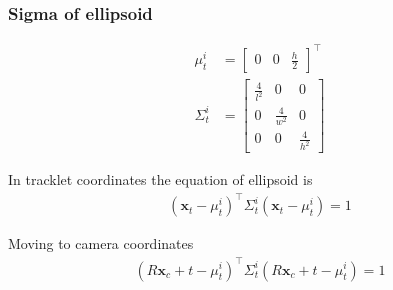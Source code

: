 \documentclass[10pt,twocolumn,letterpaper]{article}
\begin{document}

\subsubsection{Sigma of ellipsoid}
\label{sec:sigmacomputation}

\newcommand{\Sigmait}{\Sigma^i_t}
\newcommand{\muit}{\mu^i_t}
\begin{align}
  \muit &= \begin{bmatrix}
  0& 0& \frac{h}{2}
  \end{bmatrix}^\top\\
  \Sigmait &= \begin{bmatrix}
    \frac{4}{l^2} & 0 & 0 \\
    0 & \frac{4}{w^2} & 0 \\
    0 & 0 & \frac{4}{h^2}
  \end{bmatrix}
\end{align}

In tracklet coordinates the equation of ellipsoid is 
\newcommand{\xt}{\mathbf{x}_t}
\newcommand{\xc}{\mathbf{x}_c}
\begin{align}
  (\xt - \muit)^\top \Sigmait (\xt - \muit) = 1
\end{align}


Moving to camera coordinates
\newcommand{\Rctot}{R}
\newcommand{\tctot}{t}
\begin{align}
  (\Rctot \xc + \tctot - \muit)^\top \Sigmait (\Rctot \xc + \tctot - \muit) = 1
\end{align}
\end{document}
